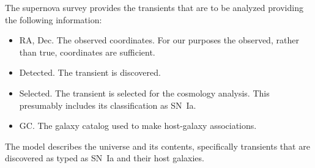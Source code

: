 \documentclass[preprint]{aastex}
\begin{document}
The supernova survey provides the transients that are to be analyzed providing
the following information:
\begin{itemize}
\item ${\text{RA}}$, ${\text{Dec}}$.  The observed
coordinates.  For our purposes the observed, rather than true, coordinates are sufficient.
\item Detected.  The transient is discovered.
\item Selected. The transient is selected for the cosmology analysis.  This presumably
includes its classification as SN~Ia.
\item GC.  The galaxy catalog used to make host-galaxy associations.
\end{itemize}

The model describes the universe and its contents, specifically transients
that are discovered as typed as SN~Ia and their host galaxies.
\end{document}
